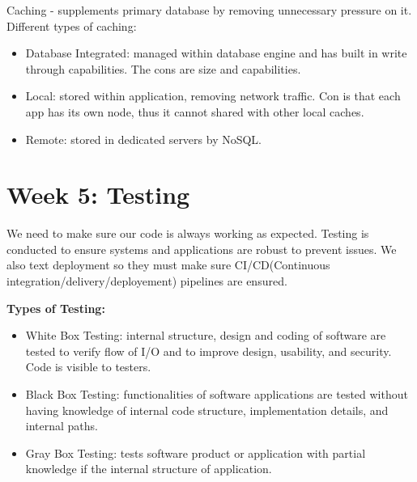 \documentclass[11pt]{article}
\begin{document}
Caching - supplements primary database by removing unnecessary pressure
on it. Different types of caching:

\begin{itemize}
\item
  Database Integrated: managed within database engine and has built in
  write through capabilities. The cons are size and capabilities.\\
\item
  Local: stored within application, removing network traffic. Con is
  that each app has its own node, thus it cannot shared with other local
  caches.\\
\item
  Remote: stored in dedicated servers by NoSQL.
\end{itemize}


\section*{Week 5: Testing}
We need to make sure our code is always working as expected. Testing is conducted to ensure systems and applications are robust to prevent issues. We also text deployment so they must make sure CI/CD(Continuous integration/delivery/deployement) pipelines are ensured.

\noindent \textbf{Types of Testing:}
\begin{itemize}
    \item White Box Testing: internal structure, design and coding of software are tested to verify flow of I/O and to improve design, usability, and security. Code is visible to testers.
    \item Black Box Testing: functionalities of software applications are tested without having knowledge of internal code structure, implementation details, and internal paths. 
    \item Gray Box Testing: tests software product or application with partial knowledge if the internal structure of application.
\end{itemize}
\end{document}
